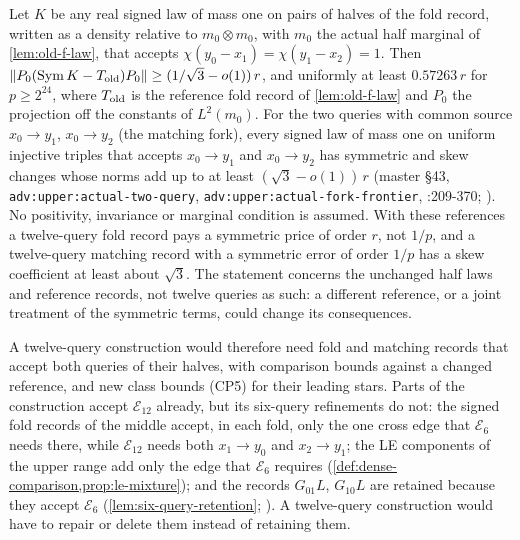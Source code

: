 \begin{remark}\label{rem:obs:twelve}
Let $K$ be any real signed law of mass one on pairs of halves of the fold record,
written as a density relative to $m_0\otimes m_0$, with $m_0$ the actual half
marginal of \cref{lem:old-f-law}, that accepts $\chi(y_0-x_1)=\chi(y_1-x_2)=1$.
Then $\|P_0(\operatorname{Sym}K-T_{\rm old})P_0\|\ge(1/\sqrt3-o(1))\,r$, and uniformly
at least $0.57263\,r$ for $p\ge2^{24}$, where $T_{\rm old}$ is the reference fold
record of \cref{lem:old-f-law} and $P_0$ the projection off the constants of
$L^2(m_0)$. For the two queries with common source $x_0\to y_1$, $x_0\to y_2$ (the matching fork), every signed law of mass
one on uniform injective triples that accepts $x_0\to y_1$ and $x_0\to y_2$ has
symmetric and skew changes whose norms add up to at least $(\sqrt3-o(1))\,r$
(master \S43, \texttt{adv:upper:actual-two-query},
\texttt{adv:upper:actual-fork-frontier},
:209-370;
). No
positivity, invariance or marginal condition is assumed. With these references a
twelve-query fold record pays a symmetric price of order $r$, not $1/p$, and a
twelve-query matching record with a symmetric error of order $1/p$ has a skew
coefficient at least about $\sqrt3$. The statement concerns the unchanged half
laws and reference records, not twelve queries as such: a different reference,
or a joint treatment of the symmetric terms, could change its consequences.
\end{remark}

A twelve-query construction would therefore need fold and matching records that
accept both queries of their halves, with comparison bounds against a changed
reference, and new class bounds (CP5) for their leading stars. Parts of the
construction accept $\mathcal E_{12}$ already, but its six-query refinements do
not: the signed fold records of the middle accept, in each fold, only the one
cross edge that $\mathcal E_6$ needs there, while $\mathcal E_{12}$ needs both
$x_1\to y_0$ and $x_2\to y_1$; the LE components of the upper range add only the
edge that $\mathcal E_6$ requires (\cref{def:dense-comparison,prop:le-mixture}); and the
records $G_{01}L$, $G_{10}L$ are retained because they accept $\mathcal E_6$
(\cref{lem:six-query-retention};
). A twelve-query construction would have to repair or delete them instead of retaining them.

